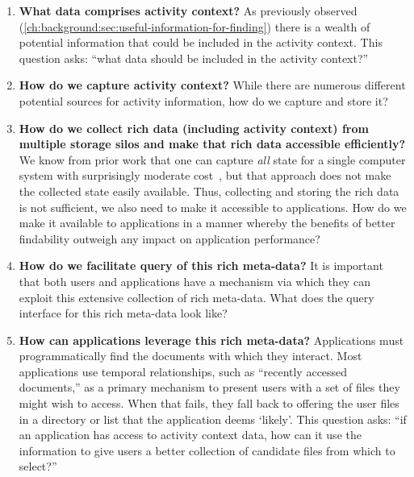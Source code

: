 \begin{enumerate}
    \item \label{rq:define-ac} \textbf{What data comprises activity context?} As
          previously observed
          (\autoref{ch:background:sec:useful-information-for-finding}) there is
          a wealth of potential information that could be included in the activity
          context.  This question asks: ``what data should be included in the activity
          context?''

    \item \label{rq:capture-ac} \textbf{How do we capture activity context?}
          While there are numerous different potential sources for activity
          information, how do we capture and store it?

    \item \label{rq:rich-data} \textbf{How do we collect rich data (including
              activity context) from multiple storage silos and make that rich data
              accessible efficiently?}
          We know from prior work that one can
          capture \emph{all} state for a single computer system with
          surprisingly moderate cost~\cite{devecsery2014eidetic}, but that
          approach does not make the collected state easily available.
          Thus, collecting and storing the rich data is not sufficient, we
          also need to make it accessible to applications. How do we make it
          available to applications in a manner whereby the benefits of better
          findability outweigh any impact on application performance?

    \item \label{rq:meta-data-query} \textbf{How do we facilitate query of this
              rich meta-data?} It is important that both users and applications have a
          mechanism via which they can exploit this extensive collection of rich
          meta-data.  What does the query interface for this rich meta-data look like?

    \item \label{rq:leverage-ac} \textbf{How can applications leverage this rich
              meta-data?} Applications must programmatically find the documents with which
          they interact.  Most applications use temporal relationships, such as
          ``recently accessed documents,'' as a primary mechanism to present users
          with a set of files they might wish to access.  When that fails, they fall
          back to offering the user files in a directory or list that the application
          deems `likely'.  This question asks: ``if an application has access to
          activity context data, how can it use the information to give users a better
          collection of candidate files from which to select?''


\end{enumerate}
